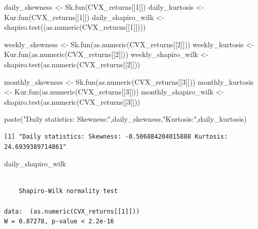 \documentclass[
  letterpaper,
  DIV=11,
  numbers=noendperiod]{scrartcl}
\newenvironment{Shaded}{\begin{snugshade}}{\end{snugshade}}
\newcommand{\DecValTok}[1]{\textcolor[rgb]{0.68,0.00,0.00}{#1}}
\newcommand{\FunctionTok}[1]{\textcolor[rgb]{0.28,0.35,0.67}{#1}}
\newcommand{\NormalTok}[1]{\textcolor[rgb]{0.00,0.23,0.31}{#1}}
\newcommand{\OtherTok}[1]{\textcolor[rgb]{0.00,0.23,0.31}{#1}}
\newcommand{\StringTok}[1]{\textcolor[rgb]{0.13,0.47,0.30}{#1}}
\begin{document}
\begin{Shaded}
\begin{Highlighting}[]
\NormalTok{daily\_skewness }\OtherTok{\textless{}{-}} \FunctionTok{Sk.fun}\NormalTok{(CVX\_returns[[}\DecValTok{1}\NormalTok{]])}
\NormalTok{daily\_kurtosis }\OtherTok{\textless{}{-}} \FunctionTok{Kur.fun}\NormalTok{(CVX\_returns[[}\DecValTok{1}\NormalTok{]])}
\NormalTok{daily\_shapiro\_wilk }\OtherTok{\textless{}{-}} \FunctionTok{shapiro.test}\NormalTok{((}\FunctionTok{as.numeric}\NormalTok{(CVX\_returns[[}\DecValTok{1}\NormalTok{]])))}

\NormalTok{weekly\_skewness }\OtherTok{\textless{}{-}} \FunctionTok{Sk.fun}\NormalTok{(}\FunctionTok{as.numeric}\NormalTok{(CVX\_returns[[}\DecValTok{2}\NormalTok{]]))}
\NormalTok{weekly\_kurtosis }\OtherTok{\textless{}{-}} \FunctionTok{Kur.fun}\NormalTok{(}\FunctionTok{as.numeric}\NormalTok{(CVX\_returns[[}\DecValTok{2}\NormalTok{]]))}
\NormalTok{weekly\_shapiro\_wilk }\OtherTok{\textless{}{-}} \FunctionTok{shapiro.test}\NormalTok{(}\FunctionTok{as.numeric}\NormalTok{(CVX\_returns[[}\DecValTok{2}\NormalTok{]]))}

\NormalTok{monthly\_skewness }\OtherTok{\textless{}{-}} \FunctionTok{Sk.fun}\NormalTok{(}\FunctionTok{as.numeric}\NormalTok{(CVX\_returns[[}\DecValTok{3}\NormalTok{]]))}
\NormalTok{monthly\_kurtosis }\OtherTok{\textless{}{-}} \FunctionTok{Kur.fun}\NormalTok{(}\FunctionTok{as.numeric}\NormalTok{(CVX\_returns[[}\DecValTok{3}\NormalTok{]]))}
\NormalTok{monthly\_shapiro\_wilk }\OtherTok{\textless{}{-}} \FunctionTok{shapiro.test}\NormalTok{(}\FunctionTok{as.numeric}\NormalTok{(CVX\_returns[[}\DecValTok{3}\NormalTok{]]))}

\FunctionTok{paste}\NormalTok{(}\StringTok{"Daily statistics: Skewness:"}\NormalTok{,daily\_skewness,}\StringTok{"Kurtosis:"}\NormalTok{,daily\_kurtosis)}
\end{Highlighting}
\end{Shaded}

\begin{verbatim}
[1] "Daily statistics: Skewness: -0.506884204015888 Kurtosis: 24.6939389714861"
\end{verbatim}

\begin{Shaded}
\begin{Highlighting}[]
\NormalTok{daily\_shapiro\_wilk}
\end{Highlighting}
\end{Shaded}

\begin{verbatim}

    Shapiro-Wilk normality test

data:  (as.numeric(CVX_returns[[1]]))
W = 0.87278, p-value < 2.2e-16
\end{verbatim}
\end{document}
